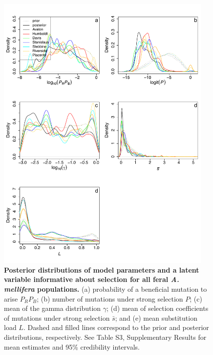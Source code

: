 \documentclass[a4paper, 12pt]{article}
\begin{document}
\begin{figure}[ht]
  \centering 
  \includegraphics[width=0.95\textwidth]{Figures/FigureS27_weighted_densityPlots_selection_feralbees.pdf}
  \small\caption{\textbf{Posterior distributions of model parameters and a latent variable informative about selection for all feral \textit{A. mellifera} populations.} (a) probability of a beneficial mutation to arise $P_RP_B$; (b) number of mutations under strong selection $P$; (c)  mean of the gamma distribution $\gamma$; (d) mean of selection coefficients of mutations under strong selection $\bar{s}$; and (e) mean substitution load $L$. Dashed and filled lines correspond to the prior and posterior distributions, respectively. See Table S3, Supplementary Results for mean estimates and 95\% credibility intervals.}
  \label{fig:supple_feralbee_densityselection}
\end{figure}
\end{document}
